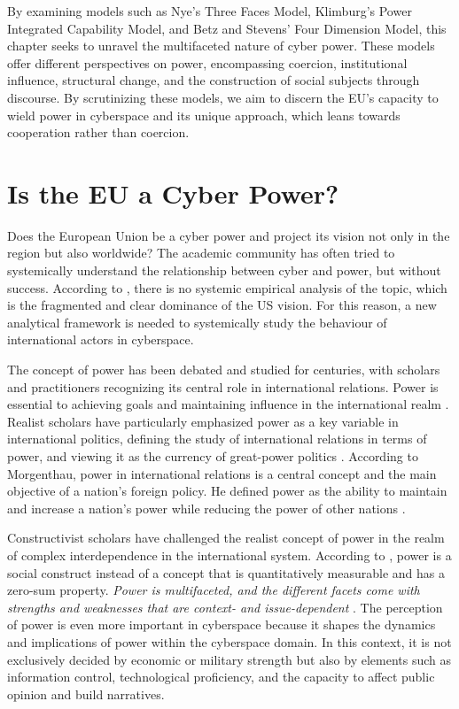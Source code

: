 By examining models such as Nye's Three Faces Model, Klimburg's Power Integrated Capability Model, and Betz and Stevens' Four Dimension Model, this chapter seeks to unravel the multifaceted nature of cyber power. These models offer different perspectives on power, encompassing coercion, institutional influence, structural change, and the construction of social subjects through discourse. By scrutinizing these models, we aim to discern the EU's capacity to wield power in cyberspace and its unique approach, which leans towards cooperation rather than coercion.
        

\section{Is the EU a Cyber Power?}

Does the European Union be a cyber power and project its vision not only in the region but also worldwide? The academic community has often tried to systemically understand the relationship between cyber and power, but without success. According to \textcite{dunncavelty_2018_europes}, there is no systemic empirical analysis of the topic, which is the fragmented and clear dominance of the US vision. For this reason, a new analytical framework is needed to systemically study the behaviour of international actors in cyberspace. 

The concept of power has been debated and studied for centuries, with scholars and practitioners recognizing its central role in international relations. Power is essential to achieving goals and maintaining influence in the international realm \autocite{holsti_1964_the}. Realist scholars have particularly emphasized power as a key variable in international politics, defining the study of international relations in terms of power, and viewing it as the currency of great-power politics \autocite{fels_2016_power}. According to Morgenthau, power in international relations is a central concept and the main objective of a nation's foreign policy. He defined power as the ability to maintain and increase a nation's power while reducing the power of other nations \autocite{morgenthau_1948_politics}. 

Constructivist scholars have challenged the realist concept of power in the realm of complex interdependence in the international system. According to \textcite{pan_2014_rethinking}, power is a social construct instead of a concept that is quantitatively measurable and has a zero-sum property. \textit{Power is multifaceted, and the different facets come with strengths and weaknesses that are context- and issue-dependent} \autocite[14]{dunncavelty_2018_europes}. The perception of power is even more important in cyberspace because it shapes the dynamics and implications of power within the cyberspace domain. In this context, it is not exclusively decided by economic or military strength but also by elements such as information control, technological proficiency, and the capacity to affect public opinion and build narratives.


